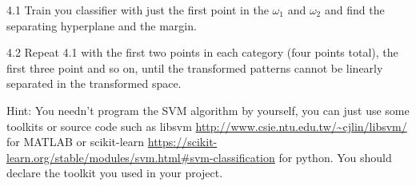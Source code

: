\documentclass{article}
\theoremstyle{definition}
\theoremstyle{definition}
\theoremstyle{remark}
\begin{document}
4.1 Train you classifier with just the first point in the $\omega_1$ and $\omega_2$ and find the separating hyperplane and the margin.

4.2 Repeat 4.1 with the first two points in each category (four points total), the first three point and so on, until the transformed patterns cannot be linearly separated in the transformed space.

Hint: You needn't program the SVM algorithm by yourself, you can just use some toolkits or source code such as libsvm \url{http://www.csie.ntu.edu.tw/~cjlin/libsvm/} for MATLAB or scikit-learn \url{https://scikit-learn.org/stable/modules/svm.html#svm-classification} for python. You should declare the toolkit you used in your project.
\end{document}
